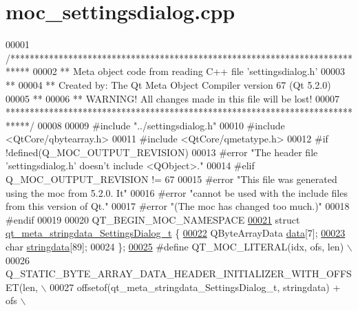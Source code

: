 \hypertarget{a00069_source}{\section{moc\+\_\+settingsdialog.\+cpp}
\label{a00069_source}
}

\begin{DoxyCode}
00001 \textcolor{comment}{/****************************************************************************}
00002 \textcolor{comment}{** Meta object code from reading C++ file 'settingsdialog.h'}
00003 \textcolor{comment}{**}
00004 \textcolor{comment}{** Created by: The Qt Meta Object Compiler version 67 (Qt 5.2.0)}
00005 \textcolor{comment}{**}
00006 \textcolor{comment}{** WARNING! All changes made in this file will be lost!}
00007 \textcolor{comment}{*****************************************************************************/}
00008 
00009 \textcolor{preprocessor}{#include "../settingsdialog.h"}
00010 \textcolor{preprocessor}{#include <QtCore/qbytearray.h>}
00011 \textcolor{preprocessor}{#include <QtCore/qmetatype.h>}
00012 \textcolor{preprocessor}{#if !defined(Q\_MOC\_OUTPUT\_REVISION)}
00013 \textcolor{preprocessor}{#error "The header file 'settingsdialog.h' doesn't include <QObject>."}
00014 \textcolor{preprocessor}{#elif Q\_MOC\_OUTPUT\_REVISION != 67}
00015 \textcolor{preprocessor}{#error "This file was generated using the moc from 5.2.0. It"}
00016 \textcolor{preprocessor}{#error "cannot be used with the include files from this version of Qt."}
00017 \textcolor{preprocessor}{#error "(The moc has changed too much.)"}
00018 \textcolor{preprocessor}{#endif}
00019 
00020 QT\_BEGIN\_MOC\_NAMESPACE
\hypertarget{a00069_source_l00021}{}\hyperlink{a00069}{00021} \textcolor{keyword}{struct }\hyperlink{a00069_d1/de1/a00213}{qt\_meta\_stringdata\_SettingsDialog\_t} \{
\hypertarget{a00069_source_l00022}{}\hyperlink{a00069_a320edc752a589bd0171189d51579680e}{00022}     QByteArrayData \hyperlink{a00069_a320edc752a589bd0171189d51579680e}{data}[7];
\hypertarget{a00069_source_l00023}{}\hyperlink{a00069_ab803985b8fecb8e67a35ab5a3939845b}{00023}     \textcolor{keywordtype}{char} \hyperlink{a00069_ab803985b8fecb8e67a35ab5a3939845b}{stringdata}[89];
00024 \};
\hypertarget{a00069_source_l00025}{}\hyperlink{a00069_a75bb9482d242cde0a06c9dbdc6b83abe}{00025} \textcolor{preprocessor}{#define QT\_MOC\_LITERAL(idx, ofs, len) \(\backslash\)}
00026 \textcolor{preprocessor}{    Q\_STATIC\_BYTE\_ARRAY\_DATA\_HEADER\_INITIALIZER\_WITH\_OFFSET(len, \(\backslash\)}
00027 \textcolor{preprocessor}{    offsetof(qt\_meta\_stringdata\_SettingsDialog\_t, stringdata) + ofs \(\backslash\)}

\end{DoxyCode}
